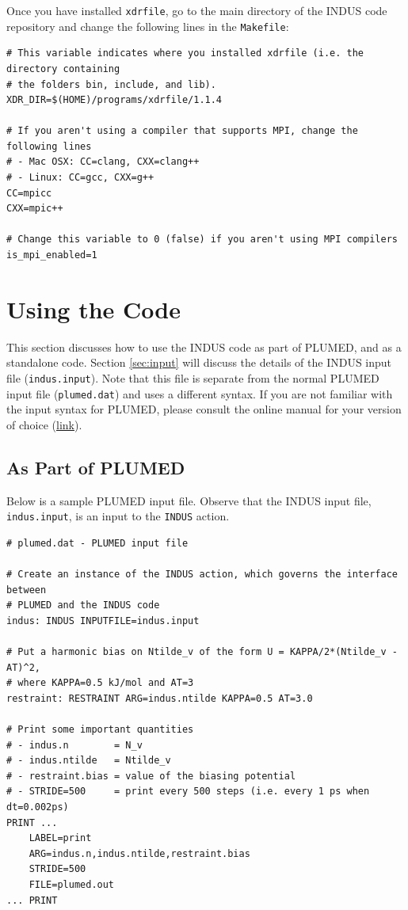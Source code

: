 \documentclass[11pt,notitlepage]{article}
\newcommand{\plumedmanual}[1][link]{\href{https://plumed.github.io/doc.html}{#1}}
\begin{document}
Once you have installed \texttt{xdrfile}, go to the main directory of the INDUS code repository and change the following lines in the \texttt{Makefile}:

\begin{lstlisting}[mathescape=false]
# This variable indicates where you installed xdrfile (i.e. the directory containing 
# the folders bin, include, and lib).
XDR_DIR=$(HOME)/programs/xdrfile/1.1.4

# If you aren't using a compiler that supports MPI, change the following lines
# - Mac OSX: CC=clang, CXX=clang++
# - Linux: CC=gcc, CXX=g++
CC=mpicc
CXX=mpic++

# Change this variable to 0 (false) if you aren't using MPI compilers
is_mpi_enabled=1
\end{lstlisting}


\section{Using the Code}


This section discusses how to use the INDUS code as part of PLUMED, and as a standalone code. Section \ref{sec:input} will discuss the details of the INDUS input file (\texttt{indus.input}). Note that this file is separate from the normal PLUMED input file (\texttt{plumed.dat}) and uses a different syntax. If you are not familiar with the input syntax for PLUMED, please consult the online manual for your version of choice (\plumedmanual).


\subsection{As Part of PLUMED}

Below is a sample PLUMED input file. Observe that the INDUS input file, \texttt{indus.input}, is an input to the \texttt{INDUS} action.

\begin{lstlisting}
# plumed.dat - PLUMED input file

# Create an instance of the INDUS action, which governs the interface between
# PLUMED and the INDUS code
indus: INDUS INPUTFILE=indus.input

# Put a harmonic bias on Ntilde_v of the form U = KAPPA/2*(Ntilde_v - AT)^2,
# where KAPPA=0.5 kJ/mol and AT=3
restraint: RESTRAINT ARG=indus.ntilde KAPPA=0.5 AT=3.0

# Print some important quantities
# - indus.n        = N_v
# - indus.ntilde   = Ntilde_v
# - restraint.bias = value of the biasing potential
# - STRIDE=500     = print every 500 steps (i.e. every 1 ps when dt=0.002ps)
PRINT ...
	LABEL=print
	ARG=indus.n,indus.ntilde,restraint.bias
	STRIDE=500
	FILE=plumed.out
... PRINT
\end{lstlisting}
\end{document}
